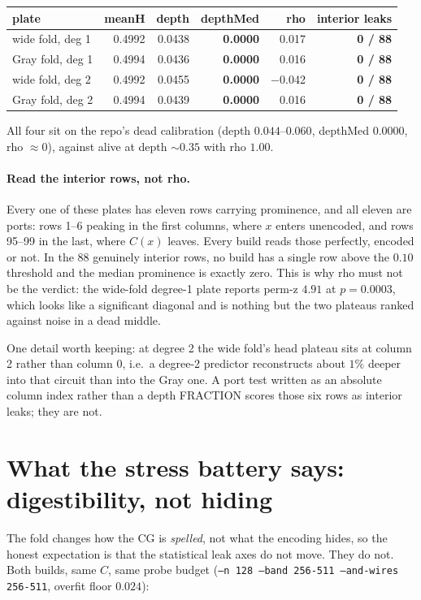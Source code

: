 \documentclass[11pt]{article}
\newcommand{\code}[1]{\texttt{#1}}
\begin{document}
\begin{center}
\begin{tabular}{lrrrrr}
\toprule
plate & meanH & depth & depthMed & rho & interior leaks \\
\midrule
wide fold, deg 1 & 0.4992 & 0.0438 & \textbf{0.0000} & 0.017 & \textbf{0 / 88} \\
Gray fold, deg 1 & 0.4994 & 0.0436 & \textbf{0.0000} & 0.016 & \textbf{0 / 88} \\
wide fold, deg 2 & 0.4992 & 0.0455 & \textbf{0.0000} & $-$0.042 & \textbf{0 / 88} \\
Gray fold, deg 2 & 0.4994 & 0.0439 & \textbf{0.0000} & 0.016 & \textbf{0 / 88} \\
\bottomrule
\end{tabular}
\end{center}

All four sit on the repo's dead calibration (depth $0.044$--$0.060$, depthMed
$0.0000$, rho $\approx 0$), against alive at depth $\sim\!0.35$ with rho $1.00$.

\paragraph{Read the interior rows, not rho.} Every one of these plates has
eleven rows carrying prominence, and all eleven are ports: rows 1--6 peaking in
the first columns, where $x$ enters unencoded, and rows 95--99 in the last,
where $C(x)$ leaves. Every build reads those perfectly, encoded or not. In the
88 genuinely interior rows, no build has a single row above the $0.10$
threshold and the median prominence is exactly zero. This is why rho must not
be the verdict: the wide-fold degree-1 plate reports perm-z $4.91$ at
$p = 0.0003$, which looks like a significant diagonal and is nothing but the
two plateaus ranked against noise in a dead middle.

One detail worth keeping: at degree 2 the wide fold's head plateau sits at
column 2 rather than column 0, i.e.\ a degree-2 predictor reconstructs about
$1\%$ deeper into that circuit than into the Gray one. A port test written as
an absolute column index rather than a depth FRACTION scores those six rows as
interior leaks; they are not.

\section{What the stress battery says: digestibility, not hiding}

The fold changes how the CG is \emph{spelled}, not what the encoding hides, so
the honest expectation is that the statistical leak axes do not move. They do
not. Both builds, same $C$, same probe budget (\code{--n 128 --band 256-511
--and-wires 256-511}, overfit floor $0.024$):
\end{document}
